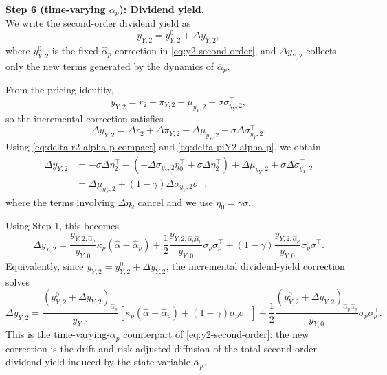 \noindent\textbf{Step 6 (time-varying $\alpha_p$): Dividend yield.}\\
We write the second-order dividend yield as
\begin{equation}
    y_{Y,2}=y_{Y,2}^{0}+\Delta y_{Y,2},
\end{equation}
where $y_{Y,2}^{0}$ is the fixed-$\hat{\alpha}_p$ correction in \eqref{eq:y2-second-order}, and $\Delta y_{Y,2}$ collects only the new terms generated by the dynamics of $\overline{\alpha}_p$.

From the pricing identity,
\begin{equation}
    y_{Y,2}=r_2+\pi_{Y,2}+\mu_{y_Y,2}+\sigma\sigma_{y_Y,2}^\top,
\end{equation}
so the incremental correction satisfies
\begin{equation}\label{eq:delta-yY2-alpha-p-basic}
    \Delta y_{Y,2}
    =\Delta r_2+\Delta\pi_{Y,2}+\Delta\mu_{y_Y,2}
    +\sigma\Delta\sigma_{y_Y,2}^\top.
\end{equation}
Using \eqref{eq:delta-r2-alpha-p-compact} and \eqref{eq:delta-piY2-alpha-p}, we obtain
\begin{align}
    \Delta y_{Y,2}
    &= -\sigma\Delta\eta_2^\top
    +\left(-\Delta\sigma_{y_Y,2}\eta_0^\top+\sigma\Delta\eta_2^\top\right)
    +\Delta\mu_{y_Y,2}
    +\sigma\Delta\sigma_{y_Y,2}^\top \\
    &= \Delta\mu_{y_Y,2}
    +(1-\gamma)\Delta\sigma_{y_Y,2}\sigma^\top,
\end{align}
where the terms involving $\Delta\eta_2$ cancel and we use $\eta_0=\gamma\sigma$.

Using Step 1, this becomes
\begin{equation}\label{eq:delta-yY2-alpha-p-simplified}
    \Delta y_{Y,2}
    =\frac{y_{Y,2,\hat{\alpha}_p}}{y_{Y,0}}\kappa_p(\hat{\alpha}-\hat{\alpha}_p)
    +\frac{1}{2}\frac{y_{Y,2,\hat{\alpha}_p\hat{\alpha}_p}}{y_{Y,0}}\sigma_p\sigma_p^\top
    +(1-\gamma)\frac{y_{Y,2,\hat{\alpha}_p}}{y_{Y,0}}\sigma_p\sigma^\top.
\end{equation}
Equivalently, since $y_{Y,2}=y_{Y,2}^{0}+\Delta y_{Y,2}$, the incremental dividend-yield correction solves
\begin{equation}\label{eq:delta-yY2-alpha-p-operator}
    \Delta y_{Y,2}
    =\frac{(y_{Y,2}^{0}+\Delta y_{Y,2})_{\hat{\alpha}_p}}{y_{Y,0}}
    \left[\kappa_p(\hat{\alpha}-\hat{\alpha}_p)+(1-\gamma)\sigma_p\sigma^\top\right]
    +\frac{1}{2}\frac{(y_{Y,2}^{0}+\Delta y_{Y,2})_{\hat{\alpha}_p\hat{\alpha}_p}}{y_{Y,0}}\sigma_p\sigma_p^\top.
\end{equation}
This is the time-varying-$\alpha_p$ counterpart of \eqref{eq:y2-second-order}: the new correction is the drift and risk-adjusted diffusion of the total second-order dividend yield induced by the state variable $\overline{\alpha}_p$.


